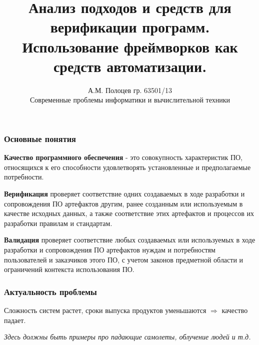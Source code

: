 \documentclass{beamer}
\title[Анализ подходов и средств]
{Анализ подходов и средств для верификации программ.
Использование фреймворков как средств автоматизации.}
\author[А.М. Полоцев]{
    А.М. Полоцев гр. 63501/13\\
    Современные проблемы информатики и вычислительной техники
}
\date[11.11.2013]{}
\begin{document}
\frame{\titlepage}

\begin{frame}
\frametitle{Основные понятия}

\textbf{Качество программного обеспечения} - это совокупность характеристик ПО,
относящихся к его способности удовлетворять установленные и предполагаемые
потребности.

\vspace{0.4cm}

\textbf{Верификация} проверяет соответствие одних создаваемых в ходе разработки
и сопровождения ПО артефактов другим, ранее созданным или используемым в
качестве исходных данных, а также соответствие этих артефактов и процессов их
разработки правилам и стандартам.

\vspace{0.4cm}

\textbf{Валидация} проверяет соответствие любых создаваемых или используемых в
ходе разработки и сопровождения ПО артефактов нуждам и потребностям
пользователей и заказчиков этого ПО, с учетом законов предметной области и
ограничений контекста использования ПО.

\end{frame}

\begin{frame}
\frametitle{Актуальность проблемы}

Сложность систем растет, сроки выпуска продуктов уменьшаются $\Rightarrow$
качество падает.

\vspace{0.4cm}

\tiny{\textit{Здесь должны быть примеры про падающие самолеты, облучение людей и т.д.}}


\end{frame}
\end{document}
